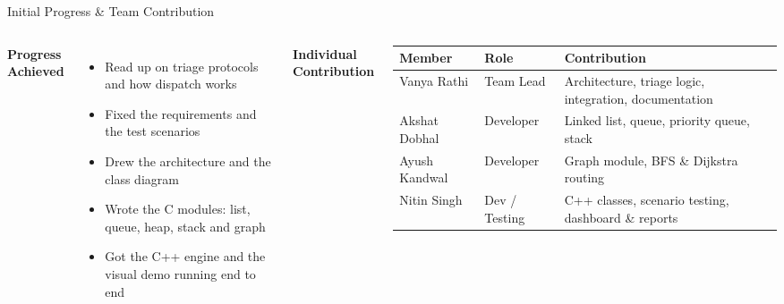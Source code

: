 \documentclass[aspectratio=169,11pt]{beamer}
\begin{document}
\begin{frame}{Initial Progress \& Team Contribution}
\begin{columns}[T,totalwidth=\textwidth]
\textbf{\color{GEUBlue}Progress Achieved}
\begin{itemize}\itemsep2pt
\small
\item Read up on triage protocols and how dispatch works
\item Fixed the requirements and the test scenarios
\item Drew the architecture and the class diagram
\item Wrote the C modules: list, queue, heap, stack and graph
\item Got the C++ engine and the visual demo running end to end
\end{itemize}
\textbf{\color{GEUBlue}Individual Contribution}
\vspace{1.5mm}
\scriptsize
\begin{tabularx}{\textwidth}{@{}p{2.0cm}p{1.9cm}X@{}}
\toprule
Member & Role & Contribution\\
\midrule
Vanya Rathi & Team Lead & Architecture, triage logic, integration, documentation\\
Akshat Dobhal & Developer & Linked list, queue, priority queue, stack\\
Ayush Kandwal & Developer & Graph module, BFS \& Dijkstra routing\\
Nitin Singh & Dev / Testing & C++ classes, scenario testing, dashboard \& reports\\
\bottomrule
\end{tabularx}
\end{columns}
\end{frame}
\end{document}
